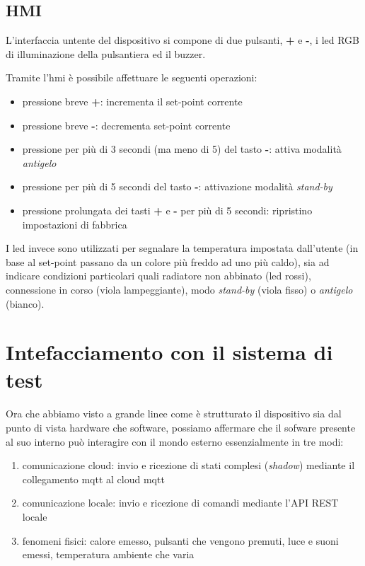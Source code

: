 \documentclass[12pt,a4paper,twoside,titlepage]{book}
\begin{document}
\subsection{HMI}

L'interfaccia untente del dispositivo si compone di due pulsanti, \textbf{+} e \textbf{-},
i \acrshort{led} RGB di illuminazione della pulsantiera ed il buzzer.

Tramite l'\acrshort{hmi} è possibile affettuare le seguenti operazioni:

\begin{itemize}
    \item pressione breve \textbf{+}: incrementa il set-point corrente
    \item pressione breve \textbf{-}: decrementa set-point corrente
    \item pressione per più di 3 secondi (ma meno di 5) del tasto \textbf{-}:
        attiva modalità \textit{antigelo}
    \item pressione per più di 5 secondi del tasto \textbf{-}: attivazione modalità
        \textit{stand-by}
    \item pressione prolungata dei tasti \textbf{+} e \textbf{-} per più di 5 secondi:
        ripristino impostazioni di fabbrica
\end{itemize}

I \acrshort{led} invece sono utilizzati per segnalare la temperatura impostata dall'utente
(in base al set-point passano da un colore più freddo ad uno più caldo), sia ad
indicare condizioni particolari quali radiatore non abbinato (\acrshort{led} rossi), connessione
in corso (viola lampeggiante), modo \textit{stand-by} (viola fisso) o \textit{antigelo} (bianco).

\section{Intefacciamento con il sistema di test}

Ora che abbiamo visto a grande linee come è strutturato il dispositivo sia dal punto
di vista hardware che software, possiamo affermare che il sofware presente al suo interno
può interagire con il mondo esterno essenzialmente in tre modi:

\begin{enumerate}
    \item comunicazione cloud: invio e ricezione di stati complesi (\textit{shadow})
        mediante il collegamento \Gls{mqtt} al cloud \Gls{mqtt}
    \item comunicazione locale: invio e ricezione di comandi mediante l'API REST locale
    \item fenomeni fisici: calore emesso, pulsanti che vengono premuti, luce e suoni
        emessi, temperatura ambiente che varia
\end{enumerate}
\end{document}
